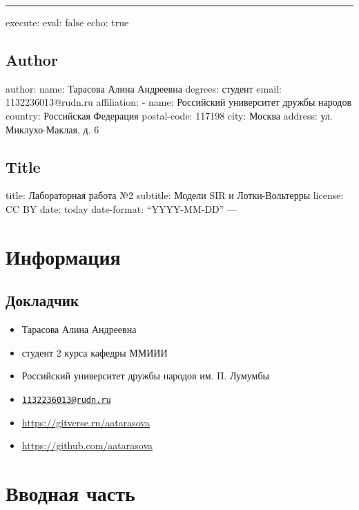 \documentclass[
  letterpaper,
  DIV=11,
  numbers=noendperiod]{scrartcl}
\author{}
\date{}
\providecommand{\tightlist}{%
  \setlength{\itemsep}{0pt}\setlength{\parskip}{0pt}}\usepackage{longtable,booktabs,array}
\begin{document}
\begin{center}\rule{0.5\linewidth}{0.5pt}\end{center}

execute: eval: false echo: true

\subsection{Author}\label{author}

author: name: Тарасова Алина Андреевна degrees: студент email:
1132236013@rudn.ru affiliation: - name: Российский университет дружбы
народов country: Российская Федерация postal-code: 117198 city: Москва
address: ул. Миклухо-Маклая, д. 6

\subsection{Title}\label{title}

title: Лабораторная работа №2 subtitle: Модели SIR и Лотки-Вольтерры
license: CC BY date: today date-format: ``YYYY-MM-DD'' ---

\section{Информация}\label{ux438ux43dux444ux43eux440ux43cux430ux446ux438ux44f}

\subsection{Докладчик}\label{ux434ux43eux43aux43bux430ux434ux447ux438ux43a}

\begin{itemize}
\tightlist
\item
  Тарасова Алина Андреевна
\item
  студент 2 курса кафедры ММИИИ
\item
  Российский университет дружбы народов им. П. Лумумбы
\item
  \href{mailto:1132236013@rudn.ru}{\nolinkurl{1132236013@rudn.ru}}
\item
  \url{https://gitverse.ru/aatarasova}
\item
  \url{https://github.com/aatarasova}
\end{itemize}

\section{Вводная
часть}\label{ux432ux432ux43eux434ux43dux430ux44f-ux447ux430ux441ux442ux44c}
\end{document}
